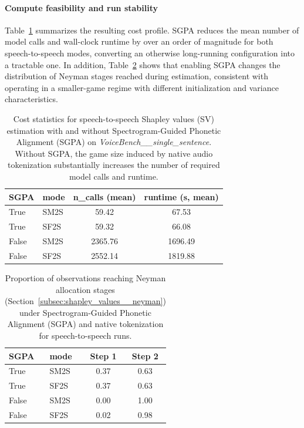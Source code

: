 \paragraph{Compute feasibility and run stability}
Table~\ref{tab:experiments__sgpa__performance} summarizes the resulting cost profile. SGPA reduces the mean number of model calls and wall-clock runtime by over an order of magnitude for both speech-to-speech modes, converting an otherwise long-running configuration into a tractable one. In addition, Table~\ref{tab:experiments__sgpa__neyman_steps} shows that enabling SGPA changes the distribution of Neyman stages reached during estimation, consistent with operating in a smaller-game regime with different initialization and variance characteristics.

\begin{table}[h!]
\centering
\caption{Cost statistics for speech-to-speech Shapley values (SV) estimation with and without Spectrogram-Guided Phonetic Alignment (SGPA) on \textit{VoiceBench\_\_single\_sentence}. Without SGPA, the game size induced by native audio tokenization substantially increases the number of required model calls and runtime.}
\begin{tabular}{llcc}
\toprule
\textbf{SGPA} & \textbf{mode} & \textbf{n\_calls (mean)} & \textbf{runtime (s, mean)} \\
\midrule
True  & SM2S & 59.42  & 67.53 \\
True  & SF2S & 59.32  & 66.08 \\
False & SM2S & 2365.76 & 1696.49 \\
False & SF2S & 2552.14 & 1819.88 \\
\bottomrule
\end{tabular}
\label{tab:experiments__sgpa__performance}
\end{table}

\begin{table}[t!]
\centering
\caption{Proportion of observations reaching Neyman allocation stages (Section~\ref{subsec:shapley_values__neyman}) under Spectrogram-Guided Phonetic Alignment (SGPA) and native tokenization for speech-to-speech runs.}
\begin{tabular}{llcc}
\toprule
\textbf{SGPA} & \textbf{mode} & \textbf{Step 1} & \textbf{Step 2} \\
\midrule
True  & SM2S & 0.37 & 0.63 \\
True  & SF2S & 0.37 & 0.63 \\
False & SM2S & 0.00 & 1.00 \\
False & SF2S & 0.02 & 0.98 \\
\bottomrule
\end{tabular}
\label{tab:experiments__sgpa__neyman_steps}
\end{table}

